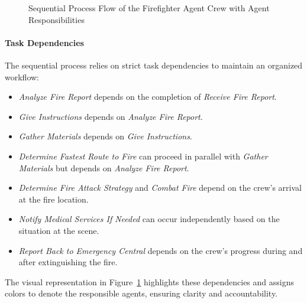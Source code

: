 \begin{figure}[h!]
    \centering
    \caption{Sequential Process Flow of the Firefighter Agent Crew with Agent Responsibilities}
    \label{fig:firefighter_flow}
\end{figure}

\paragraph{Task Dependencies}
The sequential process relies on strict task dependencies to maintain an organized workflow:
\begin{itemize}
    \item \textit{Analyze Fire Report} depends on the completion of \textit{Receive Fire Report}.
    \item \textit{Give Instructions} depends on \textit{Analyze Fire Report}.
    \item \textit{Gather Materials} depends on \textit{Give Instructions}.
    \item \textit{Determine Fastest Route to Fire} can proceed in parallel with \textit{Gather Materials} but depends on \textit{Analyze Fire Report}.
    \item \textit{Determine Fire Attack Strategy} and \textit{Combat Fire} depend on the crew’s arrival at the fire location.
    \item \textit{Notify Medical Services If Needed} can occur independently based on the situation at the scene.
    \item \textit{Report Back to Emergency Central} depends on the crew’s progress during and after extinguishing the fire.
\end{itemize}

The visual representation in Figure~\ref{fig:firefighter_flow} highlights these dependencies and assigns colors to denote the responsible agents, ensuring clarity and accountability.
